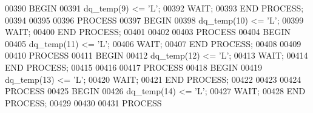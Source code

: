 \begin{DoxyCode}
00390   \textcolor{keywordflow}{BEGIN}
00391     \textcolor{vhdlchar}{dq_temp}\textcolor{vhdlchar}{(}\textcolor{vhdllogic}{}\textcolor{vhdllogic}{9}\textcolor{vhdlchar}{)} \textcolor{vhdlchar}{<=} \textcolor{vhdlchar}{'}\textcolor{vhdlchar}{L}\textcolor{vhdlchar}{'};  
00392   \textcolor{keywordflow}{WAIT};
00393   \textcolor{keywordflow}{END} \textcolor{keywordflow}{PROCESS};
00394   
00395   
00396   \textcolor{keywordflow}{PROCESS}
00397   \textcolor{keywordflow}{BEGIN}
00398     \textcolor{vhdlchar}{dq_temp}\textcolor{vhdlchar}{(}\textcolor{vhdllogic}{}\textcolor{vhdllogic}{10}\textcolor{vhdlchar}{)} \textcolor{vhdlchar}{<=} \textcolor{vhdlchar}{'}\textcolor{vhdlchar}{L}\textcolor{vhdlchar}{'};  
00399   \textcolor{keywordflow}{WAIT};
00400   \textcolor{keywordflow}{END} \textcolor{keywordflow}{PROCESS};
00401   
00402   
00403   \textcolor{keywordflow}{PROCESS}
00404   \textcolor{keywordflow}{BEGIN}
00405     \textcolor{vhdlchar}{dq_temp}\textcolor{vhdlchar}{(}\textcolor{vhdllogic}{}\textcolor{vhdllogic}{11}\textcolor{vhdlchar}{)} \textcolor{vhdlchar}{<=} \textcolor{vhdlchar}{'}\textcolor{vhdlchar}{L}\textcolor{vhdlchar}{'};  
00406   \textcolor{keywordflow}{WAIT};
00407   \textcolor{keywordflow}{END} \textcolor{keywordflow}{PROCESS};
00408   
00409   
00410   \textcolor{keywordflow}{PROCESS}
00411   \textcolor{keywordflow}{BEGIN}
00412     \textcolor{vhdlchar}{dq_temp}\textcolor{vhdlchar}{(}\textcolor{vhdllogic}{}\textcolor{vhdllogic}{12}\textcolor{vhdlchar}{)} \textcolor{vhdlchar}{<=} \textcolor{vhdlchar}{'}\textcolor{vhdlchar}{L}\textcolor{vhdlchar}{'};  
00413   \textcolor{keywordflow}{WAIT};
00414   \textcolor{keywordflow}{END} \textcolor{keywordflow}{PROCESS};
00415   
00416   
00417   \textcolor{keywordflow}{PROCESS}
00418   \textcolor{keywordflow}{BEGIN}
00419     \textcolor{vhdlchar}{dq_temp}\textcolor{vhdlchar}{(}\textcolor{vhdllogic}{}\textcolor{vhdllogic}{13}\textcolor{vhdlchar}{)} \textcolor{vhdlchar}{<=} \textcolor{vhdlchar}{'}\textcolor{vhdlchar}{L}\textcolor{vhdlchar}{'};  
00420   \textcolor{keywordflow}{WAIT};
00421   \textcolor{keywordflow}{END} \textcolor{keywordflow}{PROCESS};
00422   
00423   
00424   \textcolor{keywordflow}{PROCESS}
00425   \textcolor{keywordflow}{BEGIN}
00426     \textcolor{vhdlchar}{dq_temp}\textcolor{vhdlchar}{(}\textcolor{vhdllogic}{}\textcolor{vhdllogic}{14}\textcolor{vhdlchar}{)} \textcolor{vhdlchar}{<=} \textcolor{vhdlchar}{'}\textcolor{vhdlchar}{L}\textcolor{vhdlchar}{'};  
00427   \textcolor{keywordflow}{WAIT};
00428   \textcolor{keywordflow}{END} \textcolor{keywordflow}{PROCESS};
00429   
00430   
00431   \textcolor{keywordflow}{PROCESS}

\end{DoxyCode}
